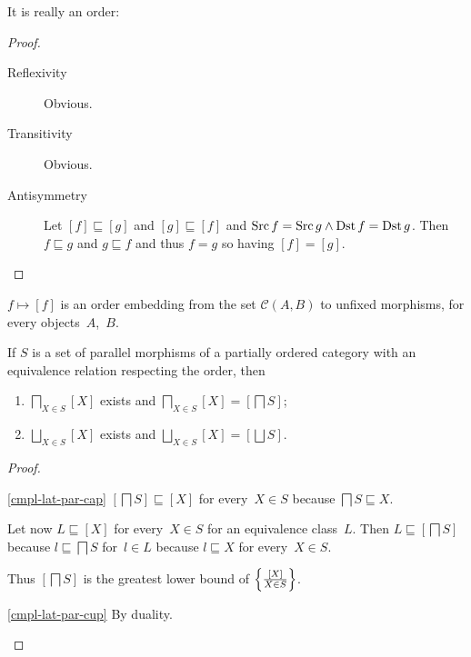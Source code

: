 It is really an order:

\begin{proof}
~
\begin{description}
\item[Reflexivity] Obvious.
\item[Transitivity] Obvious.
\item[Antisymmetry] Let $[f]\sqsubseteq[g]$ and
$[g]\sqsubseteq[f]$ and $\operatorname{Src} f=\operatorname{Src} g\land\operatorname{Dst} f=\operatorname{Dst} g$.
Then $f\sqsubseteq g$ and $g\sqsubseteq f$ and thus
$f=g$ so having $[f]=[g]$.
\end{description}
\end{proof}

\begin{obvious}\label{unfix-mor-emb}
$f\mapsto[f]$ is an order embedding from the set
$\mathcal{C}(A,B)$ to unfixed morphisms, for every
objects~$A$,~$B$.
\end{obvious}

\begin{prop}\label{cmpl-lat-par}
If $S$ is a set of parallel morphisms of a partially ordered
category with an equivalence relation respecting the order, then
\begin{enumerate}
\item\label{cmpl-lat-par-cap}
$\bigsqcap_{X\in S}[X]$ exists and 
$\bigsqcap_{X\in S}[X]=[\bigsqcap S]$;

\item\label{cmpl-lat-par-cup}
$\bigsqcup_{X\in S}[X]$ exists and 
$\bigsqcup_{X\in S}[X]=[\bigsqcup S]$.
\end{enumerate}
\end{prop}

\begin{proof}
~
\begin{widedisorder}
\item[\ref{cmpl-lat-par-cap}]
$[\bigsqcap S]\sqsubseteq[X]$ for every~$X\in S$ because
$\bigsqcap S\sqsubseteq X$.

Let now $L\sqsubseteq[X]$ for every~$X\in S$ for an
equivalence class~$L$. Then $L\sqsubseteq[\bigsqcap S]$
because $l\sqsubseteq\bigsqcap S$ for~$l\in L$ because
$l\sqsubseteq X$ for every~$X\in S$.

Thus $[\bigsqcap S]$ is the greatest lower bound of
$\left\{ \frac{[X]}{X\in S}\right\}$.

\item[\ref{cmpl-lat-par-cup}] By duality.
\end{widedisorder}
\end{proof}

